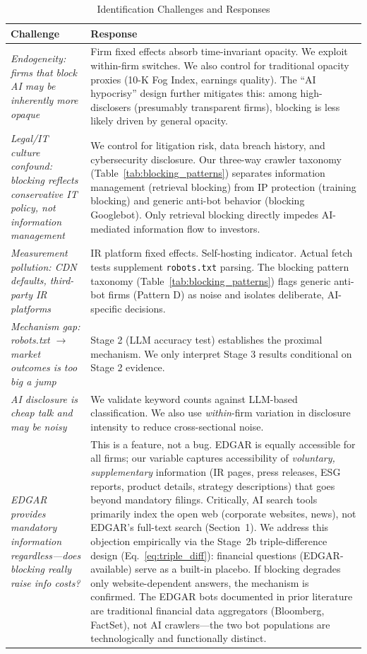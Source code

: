 \documentclass[12pt,a4paper]{article}
\begin{document}
\begin{table}[htbp]
\centering
\caption{Identification Challenges and Responses}
\label{tab:identification}
\small
\begin{tabularx}{\textwidth}{p{3.5cm}X}
\toprule
\textbf{Challenge} & \textbf{Response} \\
\midrule
\textit{Endogeneity: firms that block AI may be inherently more opaque} & Firm fixed effects absorb time-invariant opacity. We exploit within-firm switches. We also control for traditional opacity proxies (10-K Fog Index, earnings quality). The ``AI hypocrisy'' design further mitigates this: among high-disclosers (presumably transparent firms), blocking is less likely driven by general opacity. \\
\addlinespace
\textit{Legal/IT culture confound: blocking reflects conservative IT policy, not information management} & We control for litigation risk, data breach history, and cybersecurity disclosure. Our three-way crawler taxonomy (Table~\ref{tab:blocking_patterns}) separates information management (retrieval blocking) from IP protection (training blocking) and generic anti-bot behavior (blocking Googlebot). Only retrieval blocking directly impedes AI-mediated information flow to investors. \\
\addlinespace
\textit{Measurement pollution: CDN defaults, third-party IR platforms} & IR platform fixed effects. Self-hosting indicator. Actual fetch tests supplement \texttt{robots.txt} parsing. The blocking pattern taxonomy (Table~\ref{tab:blocking_patterns}) flags generic anti-bot firms (Pattern D) as noise and isolates deliberate, AI-specific decisions. \\
\addlinespace
\textit{Mechanism gap: robots.txt $\to$ market outcomes is too big a jump} & Stage 2 (LLM accuracy test) establishes the proximal mechanism. We only interpret Stage 3 results conditional on Stage 2 evidence. \\
\addlinespace
\textit{AI disclosure is cheap talk and may be noisy} & We validate keyword counts against LLM-based classification. We also use \emph{within}-firm variation in disclosure intensity to reduce cross-sectional noise. \\
\addlinespace
\textit{EDGAR provides mandatory information regardless---does blocking really raise info costs?} & This is a feature, not a bug. EDGAR is equally accessible for all firms; our variable captures accessibility of \emph{voluntary, supplementary} information (IR pages, press releases, ESG reports, product details, strategy descriptions) that goes beyond mandatory filings. Critically, AI search tools primarily index the open web (corporate websites, news), not EDGAR's full-text search (Section~1). We address this objection empirically via the Stage~2b triple-difference design (Eq.~\ref{eq:triple_diff}): financial questions (EDGAR-available) serve as a built-in placebo. If blocking degrades only website-dependent answers, the mechanism is confirmed. The EDGAR bots documented in prior literature \citep{LoughranMcDonald2017, ChenKellyWu2020} are traditional financial data aggregators (Bloomberg, FactSet), not AI crawlers---the two bot populations are technologically and functionally distinct. \\

\end{tabularx}
\end{table}
\end{document}
